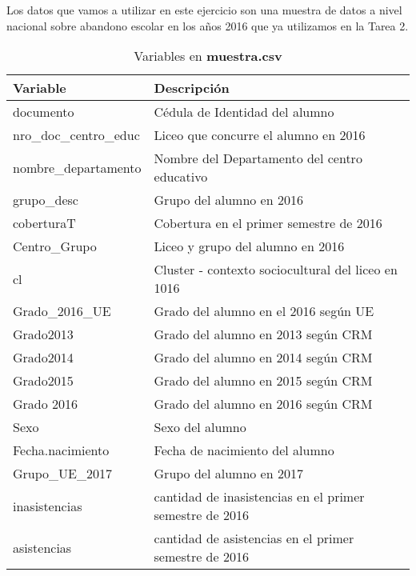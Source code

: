 \documentclass[
]{article}
\begin{document}
Los datos que vamos a utilizar en este ejercicio son una muestra de
datos a nivel nacional sobre abandono escolar en los años 2016 que ya
utilizamos en la Tarea 2.

\begin{table}[hbpt]
    \centering
    \caption{Variables en \label{tab:VAR} \textbf{muestra.csv}}
    \vspace{0.5cm}
    \begin{tabular}{|l|l|}
        \hline
    \textbf{Variable} &  \textbf{Descripción}  \\
        \hline
        documento & Cédula de Identidad del alumno  \\
        \hline
        nro\_doc\_centro\_educ & Liceo que concurre el alumno en 2016  \\
        \hline
        nombre\_departamento & Nombre del Departamento del centro educativo \\
        \hline
        grupo\_desc & Grupo del alumno en 2016 \\
        \hline
        coberturaT & Cobertura en el primer semestre de 2016  \\
        \hline
        Centro\_Grupo & Liceo y grupo del alumno en 2016 \\
        \hline
        cl    & Cluster - contexto sociocultural del liceo en 1016  \\
        \hline
        Grado\_2016\_UE & Grado del alumno en el 2016 según UE  \\
        \hline
        Grado2013 & Grado del alumno en 2013 según CRM  \\
        \hline
        Grado2014 & Grado del alumno en 2014 según CRM  \\
        \hline
        Grado2015 & Grado del alumno en 2015 según CRM \\
        \hline
        Grado 2016 & Grado del alumno en 2016 según CRM \\
        \hline
        Sexo  & Sexo del alumno \\
        \hline
        Fecha.nacimiento & Fecha de nacimiento del alumno \\
        \hline
        Grupo\_UE\_2017 & Grupo del alumno en 2017 \\
        \hline
        inasistencias & cantidad de inasistencias en el primer semestre de 2016\\
        \hline
        asistencias & cantidad de asistencias en el primer semestre de 2016  \\
        \hline
    \end{tabular}
\end{table}
\end{document}
